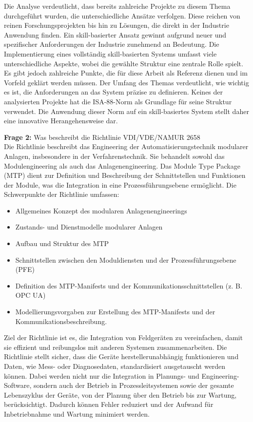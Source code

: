 	\newpage
	
	Die Analyse verdeutlicht, dass bereits zahlreiche Projekte zu diesem Thema durchgeführt wurden, die unterschiedliche Ansätze verfolgen. Diese reichen von reinen Forschungsprojekten bis hin zu Lösungen, die direkt in der Industrie Anwendung finden. Ein skill-basierter Ansatz gewinnt aufgrund neuer und spezifischer Anforderungen der Industrie zunehmend an Bedeutung.
	Die Implementierung eines vollständig skill-basierten Systems umfasst viele unterschiedliche Aspekte, wobei die gewählte Struktur eine zentrale Rolle spielt. Es gibt jedoch zahlreiche Punkte, die für diese Arbeit als Referenz dienen und im Vorfeld geklärt werden müssen. Der Umfang des Themas verdeutlicht, wie wichtig es ist, die Anforderungen an das System präzise zu definieren.
	Keines der analysierten Projekte hat die ISA-88-Norm als Grundlage für seine Struktur verwendet. Die Anwendung dieser Norm auf ein skill-basiertes System stellt daher eine innovative Herangehensweise dar.
	\vspace{3mm}
	
	\textbf{Frage 2:} Was beschreibt die Richtlinie VDI/VDE/NAMUR 2658 \vspace{2mm} 
	\\
	Die Richtlinie beschreibt das Engineering der Automatisierungstechnik modularer Anlagen, insbesondere in der Verfahrenstechnik. Sie behandelt sowohl das Modulengineering als auch das Anlagenengineering. Das Module Type Package (MTP) dient zur Definition und Beschreibung der Schnittstellen und Funktionen der Module, was die Integration in eine Prozessführungsebene ermöglicht. Die Schwerpunkte der Richtlinie umfassen:
	\begin{itemize}
		\item Allgemeines Konzept des modularen Anlagenengineerings
		\item Zustands- und Dienstmodelle modularer Anlagen
		\item Aufbau und Struktur des MTP
		\item Schnittstellen zwischen den Moduldiensten und der Prozessführungsebene (PFE)
		\item Definition des MTP-Manifests und der Kommunikationsschnittstellen (z. B. OPC UA)
		\item Modellierungsvorgaben zur Erstellung des MTP-Manifests und der Kommunikationsbeschreibung.
	\end{itemize}
	Ziel der Richtlinie ist es, die Integration von Feldgeräten zu vereinfachen, damit sie effizient und reibungslos mit anderen Systemen zusammenarbeiten. Die Richtlinie stellt sicher, dass die Geräte herstellerunabhängig funktionieren und Daten, wie Mess- oder Diagnosedaten, standardisiert ausgetauscht werden können. Dabei werden nicht nur die Integration in Planungs- und Engineering-Software, sondern auch der Betrieb in Prozessleitsystemen sowie der gesamte Lebenszyklus der Geräte, von der Planung über den Betrieb bis zur Wartung, berücksichtigt. Dadurch können Fehler reduziert und der Aufwand für Inbetriebnahme und Wartung minimiert werden.
	\vspace{3mm}
	
